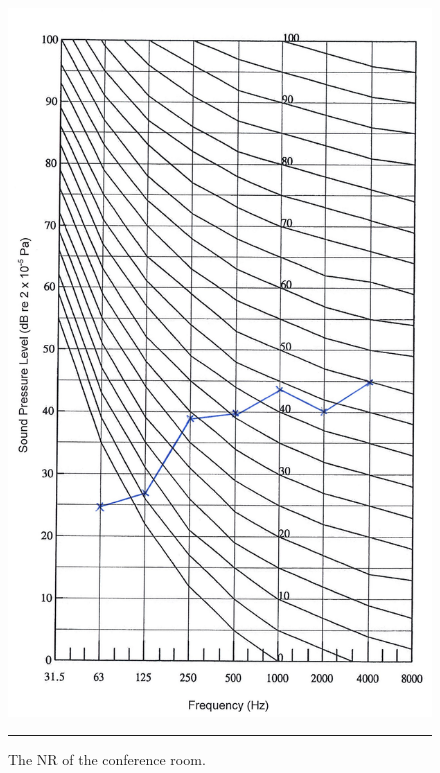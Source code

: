 \begin{figure}[htbp]
	\centering
	\includegraphics[height=.65\textheight]{figures/NR_conference.jpg}
	\rule{.6\textwidth}{0.5pt} %
	\caption{The NR of the conference room.}
	\label{fig:NR_conf}
\end{figure}